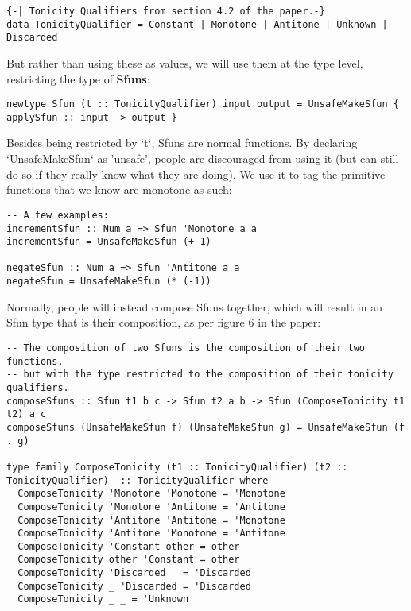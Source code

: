 \documentclass[11pt]{article}
\begin{document}
\begin{verbatim}
{-| Tonicity Qualifiers from section 4.2 of the paper.-}
data TonicityQualifier = Constant | Monotone | Antitone | Unknown | Discarded
\end{verbatim}

But rather than using these as values, we will use them at the type level, restricting the type of \textbf{Sfuns}:

\begin{verbatim}
newtype Sfun (t :: TonicityQualifier) input output = UnsafeMakeSfun { applySfun :: input -> output }
\end{verbatim}

Besides being restricted by `t`, Sfuns are normal functions.
By declaring `UnsafeMakeSfun` as 'unsafe', people are discouraged from using it (but can still do so if they really know what they are doing).
We use it to tag the primitive functions that we know are monotone as such:

\begin{verbatim}
-- A few examples:
incrementSfun :: Num a => Sfun 'Monotone a a
incrementSfun = UnsafeMakeSfun (+ 1)

negateSfun :: Num a => Sfun 'Antitone a a
negateSfun = UnsafeMakeSfun (* (-1))

\end{verbatim}

Normally, people will instead compose Sfuns together, which will result in an Sfun type that is their composition, as per figure 6 in the paper:

\begin{verbatim}
-- The composition of two Sfuns is the composition of their two functions,
-- but with the type restricted to the composition of their tonicity qualifiers.
composeSfuns :: Sfun t1 b c -> Sfun t2 a b -> Sfun (ComposeTonicity t1 t2) a c
composeSfuns (UnsafeMakeSfun f) (UnsafeMakeSfun g) = UnsafeMakeSfun (f . g)

type family ComposeTonicity (t1 :: TonicityQualifier) (t2 :: TonicityQualifier)  :: TonicityQualifier where
  ComposeTonicity 'Monotone 'Monotone = 'Monotone
  ComposeTonicity 'Monotone 'Antitone = 'Antitone
  ComposeTonicity 'Antitone 'Antitone = 'Monotone
  ComposeTonicity 'Antitone 'Monotone = 'Antitone
  ComposeTonicity 'Constant other = other
  ComposeTonicity other 'Constant = other
  ComposeTonicity 'Discarded _ = 'Discarded
  ComposeTonicity _ 'Discarded = 'Discarded
  ComposeTonicity _ _ = 'Unknown

\end{verbatim}
\end{document}
